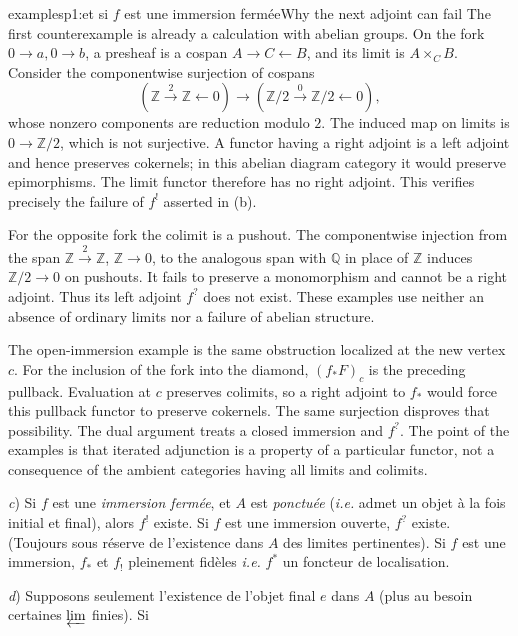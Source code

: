 \begin{dcomment}{examples}{p1:et si $f$ est une immersion fermée}{Why the next adjoint can fail}
The first counterexample is already a calculation with abelian groups. On the fork $0\to a,0\to b$, a presheaf is a cospan $A\to C\leftarrow B$, and its limit is $A\times_C B$. Consider the componentwise surjection of cospans
\[
 (\mathbb Z\xrightarrow{2}\mathbb Z\leftarrow0)
 \longrightarrow
 (\mathbb Z/2\xrightarrow{0}\mathbb Z/2\leftarrow0),
\]
whose nonzero components are reduction modulo $2$. The induced map on limits is $0\to\mathbb Z/2$, which is not surjective. A functor having a right adjoint is a left adjoint and hence preserves cokernels; in this abelian diagram category it would preserve epimorphisms. The limit functor therefore has no right adjoint. This verifies precisely the failure of $f^!$ asserted in (b).

For the opposite fork the colimit is a pushout. The componentwise injection from the span $\mathbb Z\xrightarrow{2}\mathbb Z$, $\mathbb Z\to0$, to the analogous span with $\mathbb Q$ in place of $\mathbb Z$ induces $\mathbb Z/2\to0$ on pushouts. It fails to preserve a monomorphism and cannot be a right adjoint. Thus its left adjoint $f^?$ does not exist. These examples use neither an absence of ordinary limits nor a failure of abelian structure.

The open-immersion example is the same obstruction localized at the new vertex $c$. For the inclusion of the fork into the diamond, $(f_*F)_c$ is the preceding pullback. Evaluation at $c$ preserves colimits, so a right adjoint to $f_*$ would force this pullback functor to preserve cokernels. The same surjection disproves that possibility. The dual argument treats a closed immersion and $f^?$. The point of the examples is that iterated adjunction is a property of a particular functor, not a consequence of the ambient categories having all limits and colimits.
\end{dcomment}


\textit{c}) Si $f$ est une \textit{immersion fermée}, et $A$ est \textit{ponctuée} (\textit{i.e.} admet un objet à la fois initial et final), alors $f^{!}$ existe. Si $f$ est une immersion ouverte, $f^{?}$ existe. (Toujours sous réserve
de l'existence dans $A$ des limites pertinentes). Si $f$ est une immersion, $f_{*}$ et $f_{!}$ pleinement fidèles \textit{i.e.} $f^{*}$ un foncteur de localisation.

\textit{d}) Supposons seulement l'existence de l'objet final $e$ dans $A$ (plus au besoin certaines $\varprojlim$ finies). Si

